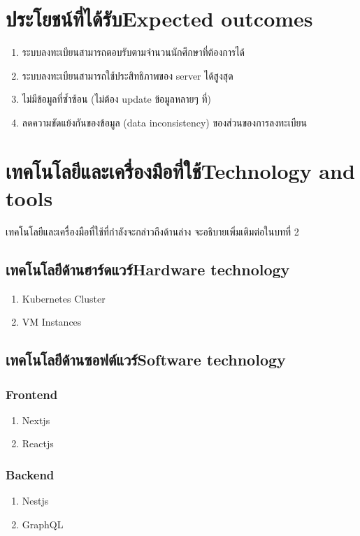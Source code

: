 \section{\ifcpe ประโยชน์ที่ได้รับ\else Expected outcomes\fi}
\begin{enumerate}
    \item ระบบลงทะเบียนสามารถตอบรับตามจำนวนนักศึกษาที่ต้องการได้
    \item ระบบลงทะเบียนสามารถใช้ประสิทธิภาพของ server ได้สูงสุด
    \item ไม่มีข้อมูลที่ซ้ำซ้อน (ไม่ต้อง update ข้อมูลหลายๆ ที่)
    \item ลดความขัดแย้งกันของข้อมูล (data inconsistency) ของส่วนของการลงทะเบียน
\end{enumerate}

\section{\ifcpe เทคโนโลยีและเครื่องมือที่ใช้\else Technology and tools\fi}

เทคโนโลยีและเครื่องมือที่ใช้ที่กำลังจะกล่าวถึงด้านล่าง จะอธิบายเพิ่มเติมต่อในบทที่ 2

\subsection{\ifcpe เทคโนโลยีด้านฮาร์ดแวร์\else Hardware technology\fi}
\begin{enumerate}
    \item Kubernetes Cluster
    \item VM Instances
\end{enumerate}

\subsection{\ifcpe เทคโนโลยีด้านซอฟต์แวร์\else Software technology\fi}
\subsubsection{Frontend}
\begin{enumerate}
    \item Nextjs \cite{nextjs}
    \item Reactjs \cite{reactjs}
\end{enumerate}

\subsubsection{Backend}
\begin{enumerate}
    \item Nestjs \cite {nestjs}
    \item GraphQL \cite {graphql}
\end{enumerate}

